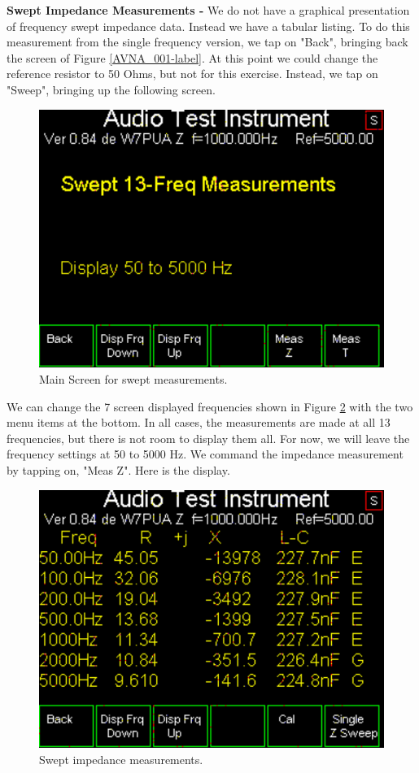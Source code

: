 \textbf{Swept Impedance Measurements - }  We do not have a graphical presentation of frequency swept impedance data.  Instead we have a tabular listing. To do this measurement from the single frequency version, we tap on "\textsf{Back}", bringing back the screen of Figure \ref{AVNA_001-label}. At this point we could change the reference resistor to 50 Ohms, but not for this exercise. Instead, we tap on "\textsf{Sweep}", bringing up the following screen.
\begin{figure}[H]
\begin{center}
\includegraphics[scale=0.75]{./images/AVNA_007.pdf}
\caption{Main Screen for swept measurements.}
\label{AVNA_007-label}
\end{center}
\end{figure}
We can change the 7 screen displayed frequencies shown in Figure \ref{AVNA_009-label} with the two menu items at the bottom.  In all cases, the measurements are made at all 13 frequencies, but there is not room to display them all.  For now, we will leave the frequency settings at 50 to 5000 Hz.  We command the impedance measurement by tapping on, "\textsf{Meas Z}".  Here is the display.
\begin{figure}[H]
\begin{center}
\includegraphics[scale=0.75]{./images/AVNA_009.pdf}
\caption{Swept impedance measurements.}
\label{AVNA_009-label}
\end{center}
\end{figure}
